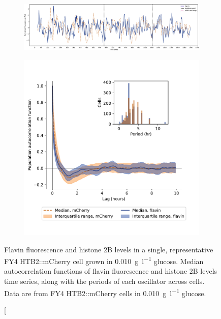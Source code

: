 \begin{figure}[b!]
  \centering
  \begin{subfigure}[htpb]{1.0\textwidth}
   \centering
   \includegraphics[width=\textwidth]{limiting_single_birth_plot_edit.pdf}
   \caption{
   }
   \label{fig:biology-lowglc-single}
  \end{subfigure}

  \begin{subfigure}[htpb]{0.7\textwidth}
   \centering
   \includegraphics[width=\textwidth]{htb2mCherry_31492_12.pdf}
   \caption{
   }
   \label{fig:biology-lowglc-acf}
  \end{subfigure}
  \caption[
    Flavin fluorescence and histone 2B levels in a single, representative FY4 HTB2::mCherry cell grown in \SI{0.010}{\gram~\litre^{-1}} glucose.
    Median autocorrelation functions of flavin fluorescence and histone 2B levels time series, along with  the periods of each oscillator across cells.
    Data are from FY4 HTB2::mCherry cells in \SI{0.010}{\gram~\litre^{-1}} glucose.

\end{figure}
